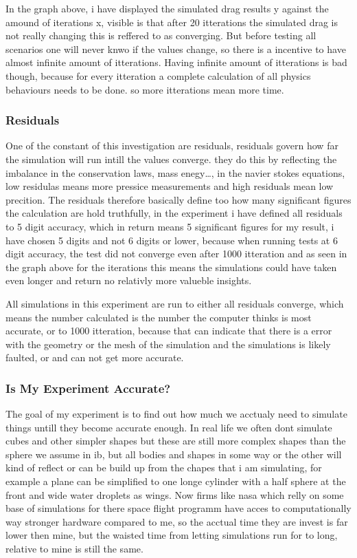 \documentclass[12pt,a4paper]{article}
\begin{document}
In the graph above, i have displayed the simulated drag results y against the amound of iterations x, visible is that after 20 itterations the simulated drag is not really changing this is reffered to as converging. But before testing all scenarios one will never knwo if the values change, so there is a incentive to have almost infinite amount of itterations. Having infinite amount of itterations is bad though, because for every itteration a complete calculation of all physics behaviours needs to be done. so more itterations mean more time.

\subsubsection{Residuals}

One of the constant of this investigation are residuals, residuals govern how far the simulation will run intill the values converge. they do this by reflecting the imbalance in the conservation laws, mass enegy…, in the navier stokes equations, low residulas means more pressice measurements and high residuals mean low precition. The residuals therefore basically define too how many significant figures the calculation are hold truthfully, in the experiment i have defined all residuals to 5 digit accuracy, which in return means 5 significant figures for my result, i have chosen 5 digits and not 6 digits or lower, because when running tests at 6 digit accuracy, the test did not converge even after 1000 itteration and as seen in the graph above for the iterations this means the simulations could have taken even longer and return no relativly more valueble insights. 

All simulations in this experiment are run to either all residuals converge, which means the number calculated is the number the computer thinks is most accurate, or to 1000 itteration, because that can indicate that there is a error with the geometry or the mesh of the simulation and the simulations is likely faulted, or and can not get more accurate.

\subsubsection{Is My Experiment Accurate?}

The goal of my experiment is to find out how much we acctualy need to simulate things untill they become accurate enough. In real life we often dont simulate cubes and other simpler shapes but these are still more complex shapes than the sphere we assume in ib, but all bodies and shapes in some way or the other will kind of reflect or can be build up from the chapes that i am simulating, for example a plane can be simplified to one longe cylinder with a half sphere at the front and wide water droplets as wings. Now firms like nasa which relly on some base of simulations for there space flight programm have acces to computationally way stronger hardware compared to me, so the acctual time they are invest is far lower then mine, but the waisted time from letting simulations run for to long, relative to mine is still the same.
\end{document}
